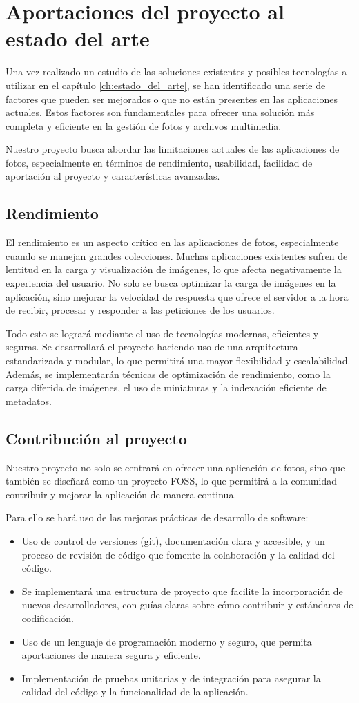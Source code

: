 \section{Aportaciones del proyecto al estado del arte}
Una vez realizado un estudio de las soluciones existentes y posibles tecnologías a utilizar en el capítulo \ref{ch:estado_del_arte}, se han identificado una serie de factores que pueden ser mejorados o que no están presentes en las aplicaciones actuales. Estos factores son fundamentales para ofrecer una solución más completa y eficiente en la gestión de fotos y archivos multimedia.

Nuestro proyecto busca abordar las limitaciones actuales de las aplicaciones de fotos, especialmente en términos de rendimiento, usabilidad, facilidad de aportación al proyecto y características avanzadas.
\subsection{Rendimiento}
El rendimiento es un aspecto crítico en las aplicaciones de fotos, especialmente cuando se manejan grandes colecciones. Muchas aplicaciones existentes sufren de lentitud en la carga y visualización de imágenes, lo que afecta negativamente la experiencia del usuario.
No solo se busca optimizar la carga de imágenes en la aplicación, sino mejorar la velocidad de respuesta que ofrece el servidor a la hora de recibir, procesar y responder a las peticiones de los usuarios.

Todo esto se logrará mediante el uso de tecnologías modernas, eficientes y seguras.
Se desarrollará el proyecto haciendo uso de una arquitectura estandarizada y modular, lo que permitirá una mayor flexibilidad y escalabilidad. Además, se implementarán técnicas de optimización de rendimiento, como la carga diferida de imágenes, el uso de miniaturas y la indexación eficiente de metadatos.
\subsection{Contribución al proyecto}
Nuestro proyecto no solo se centrará en ofrecer una aplicación de fotos, sino que también se diseñará como un proyecto FOSS, lo que permitirá a la comunidad contribuir y mejorar la aplicación de manera continua.

Para ello se hará uso de las mejoras prácticas de desarrollo de software:
\begin{itemize}
    \item Uso de control de versiones (\Gls{git}), documentación clara y accesible, y un proceso de revisión de código que fomente la colaboración y la calidad del código.
    \item Se implementará una estructura de proyecto que facilite la incorporación de nuevos desarrolladores, con guías claras sobre cómo contribuir y estándares de codificación.
    \item Uso de un lenguaje de programación moderno y seguro, que permita aportaciones de manera segura y eficiente.
    \item Implementación de pruebas unitarias y de integración para asegurar la calidad del código y la funcionalidad de la aplicación.
\end{itemize}

